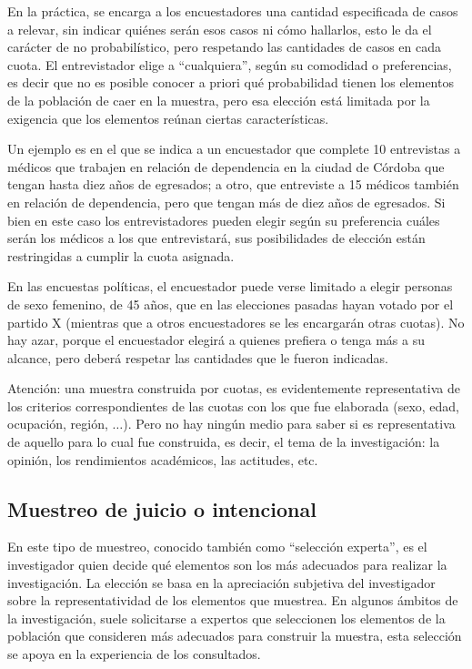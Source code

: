 \documentclass[]{book}
\begin{document}
En la práctica, se encarga a los encuestadores una cantidad especificada
de casos a relevar, sin indicar quiénes serán esos casos ni cómo
hallarlos, esto le da el carácter de no probabilístico, pero respetando
las cantidades de casos en cada cuota. El entrevistador elige a
``cualquiera'', según su comodidad o preferencias, es decir que no es
posible conocer a priori qué probabilidad tienen los elementos de la
población de caer en la muestra, pero esa elección está limitada por la
exigencia que los elementos reúnan ciertas características.

Un ejemplo es en el que se indica a un encuestador que complete 10
entrevistas a médicos que trabajen en relación de dependencia en la
ciudad de Córdoba que tengan hasta diez años de egresados; a otro, que
entreviste a 15 médicos también en relación de dependencia, pero que
tengan más de diez años de egresados. Si bien en este caso los
entrevistadores pueden elegir según su preferencia cuáles serán los
médicos a los que entrevistará, sus posibilidades de elección están
restringidas a cumplir la cuota asignada.

En las encuestas políticas, el encuestador puede verse limitado a elegir
personas de sexo femenino, de 45 años, que en las elecciones pasadas
hayan votado por el partido X (mientras que a otros encuestadores se les
encargarán otras cuotas). No hay azar, porque el encuestador elegirá a
quienes prefiera o tenga más a su alcance, pero deberá respetar las
cantidades que le fueron indicadas.

Atención: una muestra construida por cuotas, es evidentemente
representativa de los criterios correspondientes de las cuotas con los
que fue elaborada (sexo, edad, ocupación, región, \(\ldots\)). Pero no hay ningún
medio para saber si es representativa de aquello para lo cual fue
construida, es decir, el tema de la investigación: la opinión, los
rendimientos académicos, las actitudes, etc.

\hypertarget{muestreo-de-juicio-o-intencional}{%
\subsection{Muestreo de juicio o intencional}\label{muestreo-de-juicio-o-intencional}}

En este tipo de muestreo, conocido también como ``selección experta'', es
el investigador quien decide qué elementos son los más adecuados para
realizar la investigación. La elección se basa en la apreciación
subjetiva del investigador sobre la representatividad de los elementos
que muestrea. En algunos ámbitos de la investigación, suele solicitarse
a expertos que seleccionen los elementos de la población que consideren
más adecuados para construir la muestra, esta selección se apoya en la
experiencia de los consultados.
\end{document}
